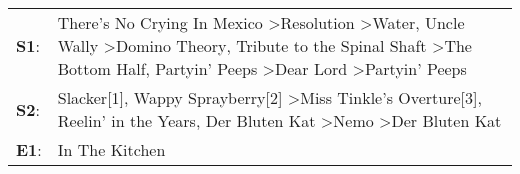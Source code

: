 \begin{supertabular}{p{0.03\textwidth}p{0.92\textwidth}}
 \textbf{S1}:  &  There's No Crying In Mexico\textsuperscript{} \textgreater \enspace Resolution\textsuperscript{} \textgreater \enspace Water\textsuperscript{}, \enspace Uncle Wally\textsuperscript{} \textgreater \enspace Domino Theory\textsuperscript{}, \enspace Tribute to the Spinal Shaft\textsuperscript{} \textgreater \enspace The Bottom Half\textsuperscript{}, \enspace Partyin' Peeps\textsuperscript{} \textgreater \enspace Dear Lord\textsuperscript{} \textgreater \enspace Partyin' Peeps\textsuperscript{}  \enspace  \\
 \textbf{S2}:  &                                                                                                                                                                    Slacker[1]\textsuperscript{}, \enspace Wappy Sprayberry[2]\textsuperscript{} \textgreater \enspace Miss Tinkle's Overture[3]\textsuperscript{}, \enspace Reelin' in the Years\textsuperscript{}, \enspace Der Bluten Kat\textsuperscript{} \textgreater \enspace Nemo\textsuperscript{} \textgreater \enspace Der Bluten Kat\textsuperscript{}  \enspace  \\
 \textbf{E1}:  &                                                                                                                                                                                                                                                                                                                                                                                                                                                                                  In The Kitchen\textsuperscript{}  \enspace  \\
\end{supertabular}
